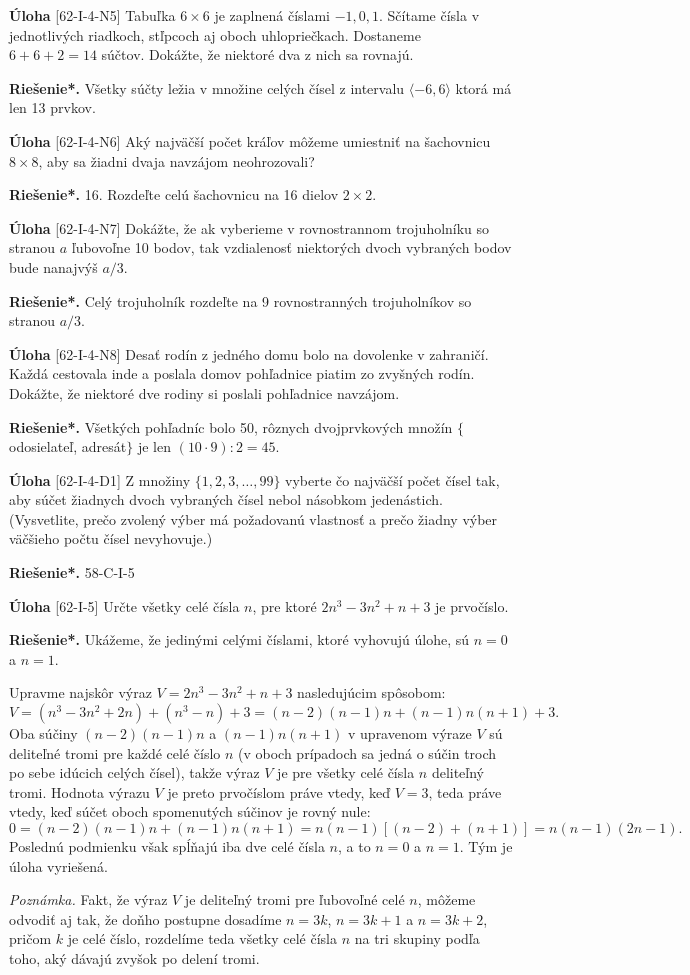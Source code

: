 \documentclass{article}
\newcommand{\rieh}{\textbf{Riešenie*.} }
\newcommand{\problem}[3]{
  \begin{tcolorbox}[breakable,notitle,boxrule=0pt,colback=light-gray,colframe=light-gray]
    \textbf{Úloha}
    [#1] #2
  \end{tcolorbox}
  \noindent#3
}
\begin{document}
\problem{62-I-4-N5}{
Tabuľka $6 \times 6$ je zaplnená číslami $-1, 0, 1$. Sčítame čísla v jednotlivých riadkoch, stľpcoch aj oboch uhlopriečkach. Dostaneme $6+6+2 = 14$ súčtov. Dokážte, že niektoré dva z nich sa rovnajú.
}{
\rieh Všetky súčty ležia v množine celých čísel z intervalu $\langle -6, 6 \rangle$ ktorá má len 13 prvkov.
}

\problem{62-I-4-N6}{
Aký najväčší počet kráľov môžeme umiestniť na šachovnicu $8\times 8$, aby sa žiadni dvaja navzájom neohrozovali?
}{
\rieh 16. Rozdeľte celú šachovnicu na 16 dielov $2\times 2$.
}


\problem{62-I-4-N7}{
Dokážte, že ak vyberieme v rovnostrannom trojuholníku so stranou $a$ ľubovoľne 10 bodov, tak vzdialenosť niektorých dvoch vybraných bodov bude nanajvýš $a/3$.
}{
\rieh Celý trojuholník rozdeľte na 9 rovnostranných trojuholníkov so stranou $a/3$.
}


\problem{62-I-4-N8}{
Desať rodín z jedného domu bolo na dovolenke v zahraničí. Každá cestovala inde a poslala domov pohľadnice piatim zo zvyšných rodín. Dokážte, že niektoré dve rodiny si poslali pohľadnice navzájom.
}{
\rieh Všetkých pohľadníc bolo 50, rôznych dvojprvkových množín $\{$odosielateľ, adresát$\}$ je len $(10\cdot9) : 2 = 45$.
}


\problem{62-I-4-D1}{
Z množiny $\{1, 2, 3, \ldots , 99\}$ vyberte čo najväčší počet čísel tak, aby súčet žiadnych dvoch vybraných čísel nebol násobkom jedenástich. (Vysvetlite, prečo zvolený výber má požadovanú vlastnosť a prečo žiadny výber väčšieho počtu čísel nevyhovuje.)
}{
\rieh 58-C-I-5
}


\problem{62-I-5}{
Určte všetky celé čísla $n$, pre ktoré $2n^3 -3n^2 +n+3$ je prvočíslo. 
}{
\rieh Ukážeme, že jedinými celými číslami, ktoré vyhovujú úlohe, sú $n = 0$ a $n = 1$.

Upravme najskôr výraz $V = 2n^3 - 3n^2 + n + 3$ nasledujúcim spôsobom:
$$V = (n^3 - 3n^2+ 2n) + (n^3 - n) + 3 = (n - 2)(n - 1)n + (n - 1)n(n + 1) + 3.$$
Oba súčiny $(n-2)(n-1)n$ a $(n-1)n(n+1)$ v upravenom výraze $V$ sú deliteľné tromi pre každé celé číslo $n$ (v oboch prípadoch sa jedná o súčin troch po sebe idúcich celých čísel), takže výraz $V$ je pre všetky celé čísla $n$ deliteľný tromi. Hodnota výrazu $V$ je preto prvočíslom práve vtedy, keď $V = 3$, teda práve vtedy, keď súčet oboch spomenutých súčinov je rovný nule:
$$0 = (n - 2)(n - 1)n + (n - 1)n(n + 1) = n(n - 1)[(n - 2) + (n + 1)] = n(n - 1)(2n - 1).$$
Poslednú podmienku však spĺňajú iba dve celé čísla $n$, a to $n = 0$ a $n = 1$. Tým je úloha vyriešená.
 
\textit{Poznámka.} Fakt, že výraz $V$ je deliteľný tromi pre ľubovoľné celé $n$, môžeme odvodiť aj tak, že doňho postupne dosadíme $n = 3k$, $n = 3k + 1$ a $n = 3k + 2$, pričom $k$ je celé číslo, rozdelíme teda všetky celé čísla $n$ na tri skupiny podľa toho, aký dávajú zvyšok po delení tromi. 
}
\end{document}
